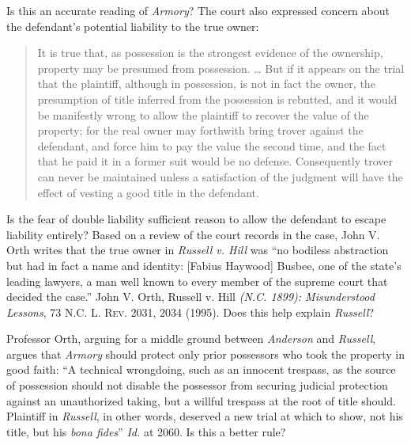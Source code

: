 Is this an accurate reading of \textit{Armory}? The court also expressed concern
about the defendant's potential liability to the true owner:
\begin{quote}
It is true that, as possession is the strongest evidence of the ownership,
property may be presumed from possession. \dots{} But if it appears on the
trial that the plaintiff, although in possession, is not in fact the owner, the
presumption of title inferred from the possession is rebutted, and it would be
manifestly wrong to allow the plaintiff to recover the value of the property;
for the real owner may forthwith bring trover against the defendant, and force
him to pay the value the second time, and the fact that he paid it in a former
suit would be no defense. Consequently trover can never be maintained unless a
satisfaction of the judgment will have the effect of vesting a good title in
the defendant.
\end{quote}
Is the fear of double liability sufficient reason to allow the defendant to
escape liability entirely? Based on a review of the court records in the case,
John V. Orth writes that the true owner in \textit{Russell v. Hill} was ``no
bodiless abstraction but had in fact a name and identity: [Fabius Haywood]
Busbee, one of the state's leading lawyers, a man well known to every member of
the supreme court that decided the case.'' John V. Orth, Russell v.
Hill \textit{(N.C. 1899): Misunderstood Lessons}, 73 \textsc{N.C. L. Rev.} 2031,
2034 (1995). Does this help explain \textit{Russell}? 

Professor Orth, arguing for a middle ground between \textit{Anderson} and
\textit{Russell}, argues that \textit{Armory} should protect only prior
possessors who took the property in good faith: ``A technical wrongdoing, such
as an innocent trespass, as the source of possession should not disable the
possessor from securing judicial protection against an unauthorized taking, but
a willful trespass at the root of title should. Plaintiff in \textit{Russell},
in other words, deserved a new trial at which to show, not his title, but his
\textit{bona fides}'' \textit{Id.} at 2060. Is this a better rule?

